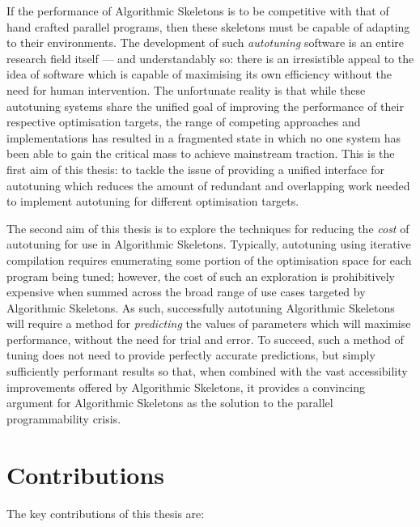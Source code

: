 
If the performance of Algorithmic Skeletons is to be competitive with
that of hand crafted parallel programs, then these skeletons must be
capable of adapting to their environments. The development of such
\emph{autotuning} software is an entire research field itself --- and
understandably so: there is an irresistible appeal to the idea of
software which is capable of maximising its own efficiency without the
need for human intervention. The unfortunate reality is that while
these autotuning systems share the unified goal of improving the
performance of their respective optimisation targets, the range of
competing approaches and implementations has resulted in a fragmented
state in which no one system has been able to gain the critical mass
to achieve mainstream traction. This is the first aim of this thesis:
to tackle the issue of providing a unified interface for autotuning
which reduces the amount of redundant and overlapping work needed to
implement autotuning for different optimisation targets.


The second aim of this thesis is to explore the techniques for
reducing the \emph{cost} of autotuning for use in Algorithmic
Skeletons. Typically, autotuning using iterative compilation requires
enumerating some portion of the optimisation space for each program
being tuned; however, the cost of such an exploration is prohibitively
expensive when summed across the broad range of use cases targeted by
Algorithmic Skeletons. As such, successfully autotuning Algorithmic
Skeletons will require a method for \emph{predicting} the values of
parameters which will maximise performance, without the need for trial
and error. To succeed, such a method of tuning does not need to
provide perfectly accurate predictions, but simply sufficiently
performant results so that, when combined with the vast accessibility
improvements offered by Algorithmic Skeletons, it provides a
convincing argument for Algorithmic Skeletons as the solution to the
parallel programmability crisis.


\section{Contributions}

The key contributions of this thesis are:


